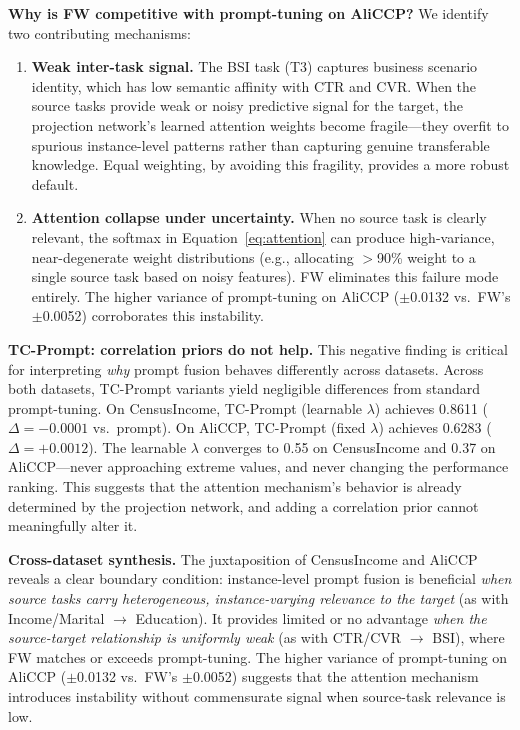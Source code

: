 \documentclass[review,anonymous]{acmart}
\begin{document}
\textbf{Why is FW competitive with prompt-tuning on AliCCP?} We identify two
contributing mechanisms:

\begin{enumerate}
  \item \textbf{Weak inter-task signal.} The BSI task (T3) captures business
    scenario identity, which has low semantic affinity with CTR and CVR. When the
    source tasks provide weak or noisy predictive signal for the target, the
    projection network's learned attention weights become fragile---they overfit
    to spurious instance-level patterns rather than capturing genuine transferable
    knowledge. Equal weighting, by avoiding this fragility, provides a more robust
    default.

  \item \textbf{Attention collapse under uncertainty.} When no source task is
    clearly relevant, the softmax in Equation~\ref{eq:attention} can produce
    high-variance, near-degenerate weight distributions (e.g., allocating $>$90\%
    weight to a single source task based on noisy features). FW eliminates this
    failure mode entirely. The higher variance of prompt-tuning on AliCCP
    ($\pm$0.0132 vs.\ FW's $\pm$0.0052) corroborates this instability.
\end{enumerate}

\textbf{TC-Prompt: correlation priors do not help.} This negative finding is
critical for interpreting \emph{why} prompt fusion behaves differently across
datasets. Across both datasets, TC-Prompt variants yield negligible differences
from standard prompt-tuning. On CensusIncome, TC-Prompt (learnable $\lambda$)
achieves 0.8611 ($\Delta = -0.0001$ vs.\ prompt). On AliCCP, TC-Prompt (fixed
$\lambda$) achieves 0.6283 ($\Delta = +0.0012$). The learnable $\lambda$
converges to 0.55 on CensusIncome and 0.37 on AliCCP---never approaching extreme
values, and never changing the performance ranking. This suggests that the
attention mechanism's behavior is already determined by the projection network,
and adding a correlation prior cannot meaningfully alter it.

\textbf{Cross-dataset synthesis.} The juxtaposition of CensusIncome and AliCCP
reveals a clear boundary condition: instance-level prompt fusion is beneficial
\emph{when source tasks carry heterogeneous, instance-varying relevance to the
target} (as with Income/Marital $\rightarrow$ Education). It provides limited or
no advantage \emph{when the source-target relationship is uniformly weak} (as with
CTR/CVR $\rightarrow$ BSI), where FW matches or exceeds prompt-tuning.
The higher variance of prompt-tuning on AliCCP ($\pm$0.0132 vs.\ FW's
$\pm$0.0052) suggests that the attention mechanism introduces instability without
commensurate signal when source-task relevance is low.
\end{document}
